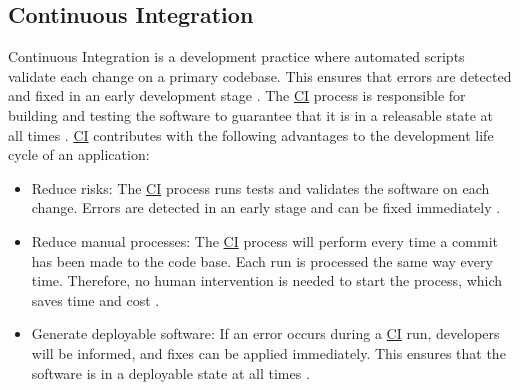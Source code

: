 \subsection{Continuous Integration}
Continuous Integration is a development practice where automated scripts validate each change on a primary codebase. This ensures that errors are detected and fixed in an early development stage \cite{Duvall2007CI}.
The \hyperlink{abbr:ci}{CI} process is responsible for building and testing the software to guarantee that it is in a releasable state at all times \cite{Rossel2017CICD}.
\hyperlink{abbr:ci}{CI} contributes with the following advantages to the development life cycle of an application:
\begin{itemize}
\item Reduce risks:
The \hyperlink{abbr:ci}{CI} process runs tests and validates the software on each change. Errors are detected in an early stage and can be fixed immediately \cite{Duvall2007CI}.

\item Reduce manual processes:
The \hyperlink{abbr:ci}{CI} process will perform every time a commit has been made to the code base.
Each run is processed the same way every time.
Therefore, no human intervention is needed to start the process, which saves time and cost \cite{Duvall2007CI}.

\item Generate deployable software:
If an error occurs during a \hyperlink{abbr:ci}{CI} run, developers will be informed, and fixes can be applied immediately.
This ensures that the software is in a deployable state at all times \cite{Duvall2007CI}.
\end{itemize}


